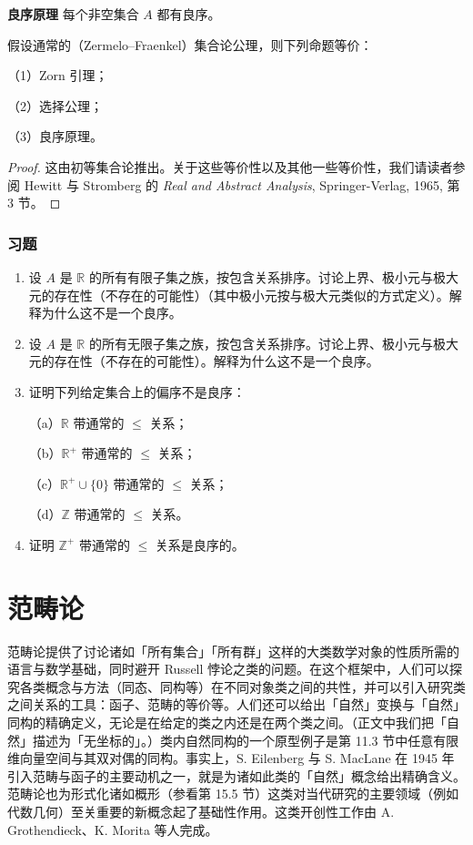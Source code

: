 \noindent\textbf{良序原理} 每个非空集合 \(A\) 都有良序。

\begin{theorem}\label{thm:A.2}
假设通常的（Zermelo--Fraenkel）集合论公理，则下列命题等价：

（1）Zorn 引理；

（2）选择公理；

（3）良序原理。
\end{theorem}

\begin{proof}
这由初等集合论推出。关于这些等价性以及其他一些等价性，我们请读者参阅 Hewitt 与 Stromberg 的 \textit{Real and Abstract Analysis}, Springer-Verlag, 1965, 第 3 节。
\end{proof}

\subsection*{习题}

\begin{enumerate}
\item 设 \(A\) 是 \(\mathbb{R}\) 的所有有限子集之族，按包含关系排序。讨论上界、极小元与极大元的存在性（不存在的可能性）（其中极小元按与极大元类似的方式定义）。解释为什么这不是一个良序。

\item 设 \(A\) 是 \(\mathbb{R}\) 的所有无限子集之族，按包含关系排序。讨论上界、极小元与极大元的存在性（不存在的可能性）。解释为什么这不是一个良序。

\item 证明下列给定集合上的偏序不是良序：

（a）\(\mathbb{R}\) 带通常的 \(\leq\) 关系；

（b）\(\mathbb{R}^+\) 带通常的 \(\leq\) 关系；

（c）\(\mathbb{R}^+ \cup \{0\}\) 带通常的 \(\leq\) 关系；

（d）\(\mathbb{Z}\) 带通常的 \(\leq\) 关系。

\item 证明 \(\mathbb{Z}^+\) 带通常的 \(\leq\) 关系是良序的。
\end{enumerate}

\chapter{范畴论}

范畴论提供了讨论诸如「所有集合」「所有群」这样的大类数学对象的性质所需的语言与数学基础，同时避开 Russell 悖论之类的问题。在这个框架中，人们可以探究各类概念与方法（同态、同构等）在不同对象类之间的共性，并可以引入研究类之间关系的工具：函子、范畴的等价等。人们还可以给出「自然」变换与「自然」同构的精确定义，无论是在给定的类之内还是在两个类之间。（正文中我们把「自然」描述为「无坐标的」。）类内自然同构的一个原型例子是第 11.3 节中任意有限维向量空间与其双对偶的同构。事实上，S. Eilenberg 与 S. MacLane 在 1945 年引入范畴与函子的主要动机之一，就是为诸如此类的「自然」概念给出精确含义。范畴论也为形式化诸如概形（参看第 15.5 节）这类对当代研究的主要领域（例如代数几何）至关重要的新概念起了基础性作用。这类开创性工作由 A. Grothendieck、K. Morita 等人完成。

